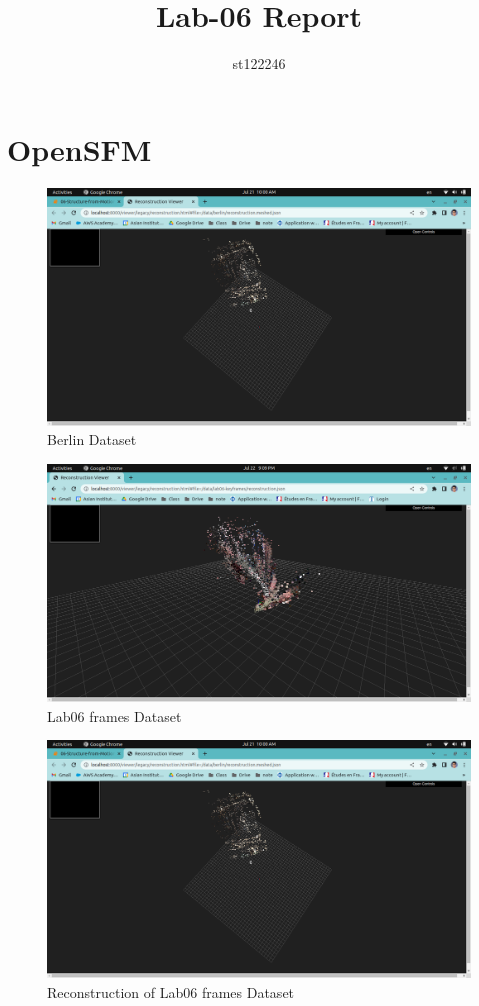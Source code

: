 \documentclass[a4paper, 12pt]{article}
\title{Lab-06 Report}
\author{st122246}
\begin{document}
	
\maketitle

\section{OpenSFM}


	\begin{figure}
		\caption{Berlin Dataset}
		\includegraphics[scale=0.25]{images/opensfm-01.png}
	\end{figure}


	\begin{figure}
		\caption{Lab06 frames Dataset}
		\includegraphics[scale=0.25]{images/opensfm-02.png}
	\end{figure}


	\begin{figure}
		\caption{Reconstruction of Lab06 frames Dataset}
		\includegraphics[scale=0.25]{images/opensfm-01.png}
	\end{figure}
\end{document}
